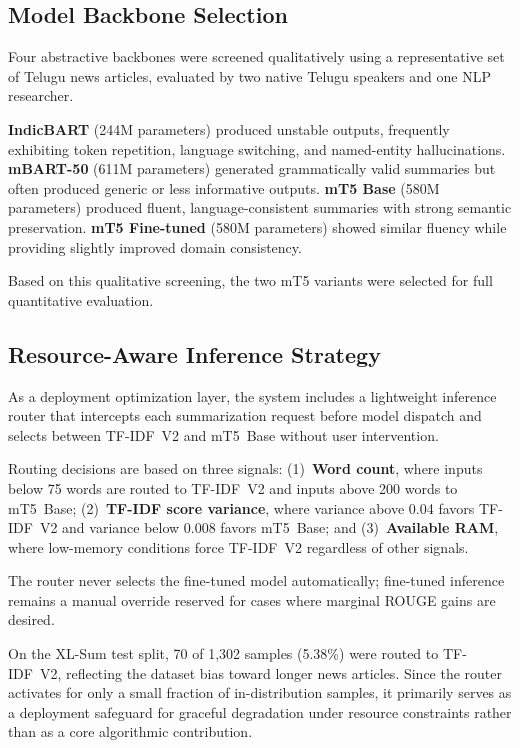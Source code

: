 \documentclass[runningheads]{llncs}
\begin{document}
\subsection{Model Backbone Selection}
\label{sec:model-selection}

Four abstractive backbones were screened qualitatively
using a representative set of Telugu news articles,
evaluated by two native Telugu speakers and one NLP
researcher.

\textbf{IndicBART} (244M parameters) produced unstable
outputs, frequently exhibiting token repetition,
language switching, and named-entity hallucinations.
\textbf{mBART-50} (611M parameters) generated
grammatically valid summaries but often produced generic
or less informative outputs. \textbf{mT5 Base}
(580M parameters) produced fluent, language-consistent
summaries with strong semantic preservation.
\textbf{mT5 Fine-tuned} (580M parameters) showed similar
fluency while providing slightly improved domain
consistency.

Based on this qualitative screening, the two mT5
variants were selected for full quantitative evaluation.

\subsection{Resource-Aware Inference Strategy}
\label{sec:router}

As a deployment optimization layer, the system includes a
lightweight inference router that intercepts each
summarization request before model dispatch and selects
between TF-IDF~V2 and mT5~Base without user intervention.

Routing decisions are based on three signals:
(1)~\textbf{Word count}, where inputs below 75 words are
routed to TF-IDF~V2 and inputs above 200 words to
mT5~Base;
(2)~\textbf{TF-IDF score variance}, where variance above
0.04 favors TF-IDF~V2 and variance below 0.008 favors
mT5~Base; and
(3)~\textbf{Available RAM}, where low-memory conditions
force TF-IDF~V2 regardless of other signals.

The router never selects the fine-tuned model
automatically; fine-tuned inference remains a manual
override reserved for cases where marginal ROUGE gains
are desired.

On the XL-Sum test split, 70 of 1,302 samples (5.38\%)
were routed to TF-IDF~V2, reflecting the dataset bias
toward longer news articles. Since the router activates
for only a small fraction of in-distribution samples, it
primarily serves as a deployment safeguard for graceful
degradation under resource constraints rather than as a
core algorithmic contribution.
\end{document}
